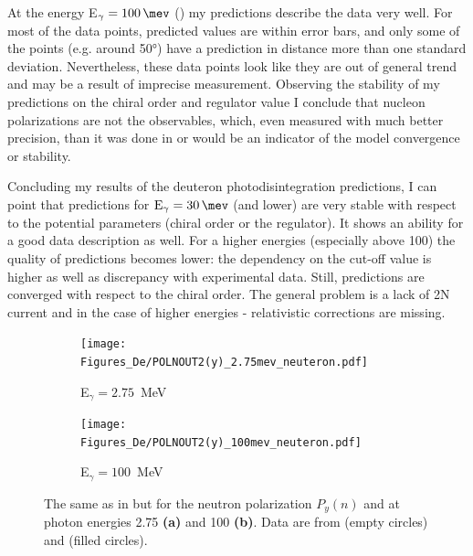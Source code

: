    At the energy E$_\gamma = \SI{100}{\mev}$ () 
    my predictions describe the data very well.
    For most of the data points, predicted values are within error bars, and only some
    of the points (e.g. around \ang{50}) have a prediction in distance more than one standard deviation.
    Nevertheless, these data points look like they are out of general trend and may be
    a result of imprecise measurement.
    Observing the stability of my predictions on the chiral order and regulator value I 
    conclude that nucleon polarizations are not the observables, which, even measured with much
    better precision, than it was done in \cite{Jewell_neuteronpolarization} or \cite{CAMERON_neuteronpolarization}
    would be an indicator of the model convergence or stability.

    Concluding my results of the deuteron photodisintegration predictions, 
    I can point that predictions for $\text{E}_\gamma = \SI{30}{\mev}$ (and lower)
    are very stable with respect to the potential parameters (chiral order or the regulator).
    It shows an ability for a good data description as well. For a higher energies (especially above \SI{100}{\mev})
    the quality of predictions becomes lower: the dependency on the cut-off value is higher as well as 
    discrepancy with experimental data. Still, predictions are converged with respect to the chiral order.
    The general problem is a lack of 2N current and in the case of higher energies - relativistic corrections are missing. 


    \begin{figure}[h]
        \centering
        \begin{subfigure}[b]{0.46\textwidth}
            \caption{\small E$_\gamma = 2.75$~MeV}
            \texttt{[image: Figures\_De/POLNOUT2(y)\_2.75mev\_neuteron.pdf]}
            \label{Pn_2p75_vert}
        \end{subfigure}
        \begin{subfigure}[b]{0.46\textwidth}
            \caption{\small E$_\gamma = 100$~MeV}
            \texttt{[image: Figures\_De/POLNOUT2(y)\_100mev\_neuteron.pdf]}
            \label{Pn_100_vert}
        \end{subfigure}
        \caption{The same as in  but for the neutron polarization
        $P_y(n)$ and at photon energies \SI{2.75}{\mev} {\bf (a)} and \SI{100}{\mev} {\bf (b)}.
        Data are from \cite{Jewell_neuteronpolarization} (empty circles)
        and \cite{CAMERON_neuteronpolarization} (filled circles).}
        \label{Pn_2p75_100}
    \end{figure}


